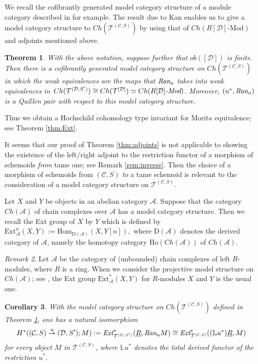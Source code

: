 \documentclass{amsart}
\newtheorem{thm}{Theorem}[section]
\newtheorem{cor}[thm]{Corollary}
\theoremstyle{definition}
\theoremstyle{remark}
\newtheorem{rem}[thm]{Remark}
\newcommand{\K}{R}%
\newcommand{\C}{{\mathcal C}}
\newcommand{\T}{{\mathcal T}}
\newcommand{\D}{\mathcal{D}}
\begin{document}
We recall the cofibrantly generated model category structure of a module category 
described in \cite[Theorem 2.3.11]{Hovey} for example.  
The result \cite[Theorem 11.9.2]{Hir} due to Kan enables us to give a model category structure to  
$Ch(\T^{(\C, S)})$ by using that of 
$Ch(\K[\D]\text{-Mod})$ and adjoints mentioned above. 

\begin{thm} \label{thm:model_category_str} With the above notation,  
suppose further that $ob([\D])$ is finite. Then there is a cofibrantly generated model category structure on $Ch(\T^{(\C, S)})$ in which 
the weak equivalences are the maps that $\text{\em Ran}_{u}$ takes into weak equivalences in 
$Ch(\T^{(\D, S')})\cong Ch(\T^{[\D]})\simeq Ch(\K[\D]\text{\em -Mod})$. Moreover, $(u^*, \text{\em Ran}_{u})$ is 
a Quillen pair with respect to this model category structure.  
\end{thm}

Thus we obtain a Hochschild cohomology type invariant for Morita equivalence; see Theorem \ref{thm:Ext}. 

It seems that our proof of Theorem \ref{thm:adjoints} is not applicable to showing the existence of the left/right adjoint to 
the restriction functor of a morphism of schemoids {\it from} tame one; see Remark \ref{rem:inverse}. Then the choice of a morphism of schemoids from $(\C, S)$ {\it to} 
a tame schemoid is relevant to the consideration of a model category structure on $\T^{(\C, S)}$.  

Let $X$ and $Y$ be objects in an abelian category $\mathcal{A}$. Suppose that the category $Ch(\mathcal{A})$ of chain complexes 
over $\mathcal{A}$ has a model category structure. 
Then we recall the Ext group of $X$ by $Y$ which is defined by
$
\text{Ext}_{\mathcal{A}}^n(X, Y) := \text{Hom}_{\text{D}(\mathcal{A})}(X, Y[n]),
$ 
where $\text{D}(\mathcal{A})$ denotes the derived category of ${\mathcal A}$, namely the homotopy category 
$\text{Ho}(Ch(\mathcal{A}))$ of $Ch(\mathcal{A})$.   

\begin{rem}\label{rem:the_usual_Ext}
Let $\mathcal{A}$ be the category of (unbounded) chain complexes of left $R$-modules, where $R$ is a ring. 
When we consider the projective model structure on $Ch(\mathcal{A})$; see \cite[Section 2.3]{Hovey}, the Ext group 
$\text{Ext}_{\mathcal{A}}^*(X, Y)$ for $R$-modules $X$ and $Y$ is the usual one.   
\end{rem}

\begin{cor}\label{cor:cohomologies}
With the model category structure on $Ch(\T^{(\C, S)})$ defined in Theorem \ref{thm:model_category_str}, one has a natural isomorphism 
$$
H^*( (\C, S) \stackrel{u}{\to} (\D, S') ; M):=\text{\em Ext}_{\T^{(\D, S')}}^*(\underline{\K}, \text{\em Ran}_uM)
 \cong \text{\em Ext}_{\T^{(\C, S)}}^*(({\mathbb L}u^*) \underline{\K}, M)
$$
for every object $M$ in $\T^{(\C, S)}$, where ${\mathbb L}u^*$ denotes the total derived functor of the restriction $u^*$. 
\end{cor}
\end{document}
